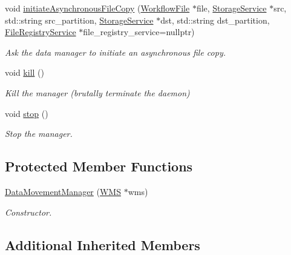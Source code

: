\begin{DoxyCompactItemize}
void \hyperlink{classwrench_1_1_data_movement_manager_a87d7d38e2d45b6024789feac0213d0b2}{initiate\+Asynchronous\+File\+Copy} (\hyperlink{classwrench_1_1_workflow_file}{Workflow\+File} $\ast$file, \hyperlink{classwrench_1_1_storage_service}{Storage\+Service} $\ast$src, std\+::string src\+\_\+partition, \hyperlink{classwrench_1_1_storage_service}{Storage\+Service} $\ast$dst, std\+::string dst\+\_\+partition, \hyperlink{classwrench_1_1_file_registry_service}{File\+Registry\+Service} $\ast$file\+\_\+registry\+\_\+service=nullptr)
\begin{DoxyCompactList}\small\item\em Ask the data manager to initiate an asynchronous file copy. \end{DoxyCompactList}\item 
\mbox{\label{classwrench_1_1_data_movement_manager_a231a54a5b09f83f8e6e9681cc3134864}} 
void \hyperlink{classwrench_1_1_data_movement_manager_a231a54a5b09f83f8e6e9681cc3134864}{kill} ()
\begin{DoxyCompactList}\small\item\em Kill the manager (brutally terminate the daemon) \end{DoxyCompactList}\item 
void \hyperlink{classwrench_1_1_data_movement_manager_a72fc97280a6f1f475e168c1f71ec5f70}{stop} ()
\begin{DoxyCompactList}\small\item\em Stop the manager. \end{DoxyCompactList}\end{DoxyCompactItemize}
\subsection*{Protected Member Functions}
\begin{DoxyCompactItemize}
\item 
\hyperlink{classwrench_1_1_data_movement_manager_aef4b101f450be0869b60dc5d656dcf1e}{Data\+Movement\+Manager} (\hyperlink{classwrench_1_1_w_m_s}{W\+MS} $\ast$wms)
\begin{DoxyCompactList}\small\item\em Constructor. \end{DoxyCompactList}\end{DoxyCompactItemize}
\subsection*{Additional Inherited Members}



